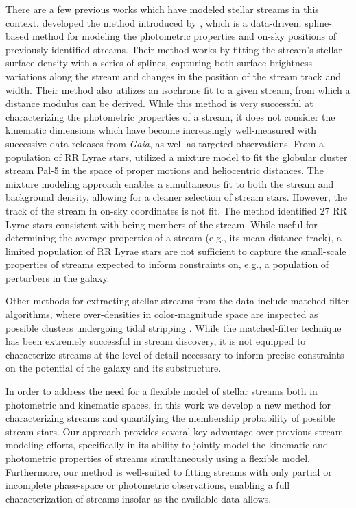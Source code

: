 \documentclass[twocolumn, linenumbers]{aastex631}
\newcommand{\dataarchive}[1]{\textit{#1}}
\newcommand{\Gaia}{\dataarchive{Gaia}}
\begin{document}
    There are a few previous works which have modeled stellar streams in this
    context. \citet{Patrick+2022} developed the method introduced by
    \citet{Erkal+2017}, which is a data-driven, spline-based method for modeling
    the photometric properties and on-sky positions of previously identified
    streams. Their method works by fitting the stream's stellar surface density
    with a series of splines, capturing both surface brightness variations along
    the stream and changes in the position of the stream track and width. Their
    method also utilizes an isochrone fit to a given stream, from which a
    distance modulus can be derived. While this method is very successful at
    characterizing the photometric properties of a stream, it does not consider
    the kinematic dimensions which have become increasingly well-measured with
    successive data releases from \Gaia{}, as well as targeted observations.
    From a population of RR Lyrae stars, \citet{Price-Whelan+2019} utilized a
    mixture model to fit the globular cluster stream Pal-5 in the space of
    proper motions and heliocentric distances.  The mixture modeling approach
    enables a simultaneous fit to both the stream and background density,
    allowing for a cleaner selection of stream stars. However, the track of the
    stream in on-sky coordinates is not fit. The method identified 27 RR Lyrae
    stars consistent with being members of the stream. While useful for
    determining the average properties of a stream (e.g., its mean distance
    track), a limited population of RR Lyrae stars are not sufficient to capture
    the small-scale properties of streams expected to inform constraints on,
    e.g., a population of perturbers in the galaxy.

    Other methods for extracting stellar streams from the data include
    matched-filter algorithms, where over-densities in color-magnitude space are
    inspected as possible clusters undergoing tidal stripping
    \citep{Grillmair+1995, GrillmairJohnson2006, Shipp+2018}.  While the
    matched-filter technique has been extremely successful in stream discovery,
    it is not equipped to characterize streams at the level of detail necessary
    to inform precise constraints on the potential of the galaxy and its
    substructure.

    In order to address the need for a flexible model of stellar streams both in
    photometric and kinematic spaces, in this work we develop a new method for
    characterizing streams and quantifying the membership probability of
    possible stream stars. Our approach provides several key advantage over
    previous stream modeling efforts, specifically in its ability to jointly
    model the kinematic and photometric properties of streams simultaneously
    using a flexible model.  Furthermore, our method is well-suited to fitting
    streams with only partial or incomplete phase-space or photometric
    observations, enabling a full characterization of streams insofar as the
    available data allows.
\end{document}
